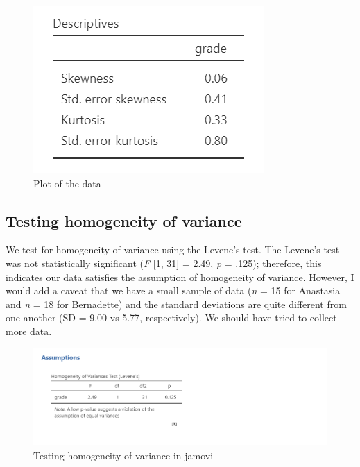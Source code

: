 \documentclass[
]{book}
\begin{document}
\begin{figure}

{\centering \includegraphics[width=0.8\linewidth]{images/02-independent_t-test/independent_t-test_skewkurtosis} 

}

\caption{Plot of the data}\label{fig:unnamed-chunk-5}
\end{figure}

\hypertarget{testing-homogeneity-of-variance}{%
\subsection{Testing homogeneity of variance}\label{testing-homogeneity-of-variance}}

We test for homogeneity of variance using the Levene's test. The Levene's test was not statistically significant (\emph{F} {[}1, 31{]} = 2.49, \emph{p} = .125); therefore, this indicates our data satisfies the assumption of homogeneity of variance. However, I would add a caveat that we have a small sample of data (\emph{n} = 15 for Anastasia and \emph{n} = 18 for Bernadette) and the standard deviations are quite different from one another (SD = 9.00 vs 5.77, respectively). We should have tried to collect more data.

\begin{figure}

{\centering \includegraphics[width=1\linewidth]{images/02-independent_t-test/independent_t-test_homogeneity} 

}

\caption{Testing homogeneity of variance in jamovi}\label{fig:unnamed-chunk-6}
\end{figure}
\end{document}
